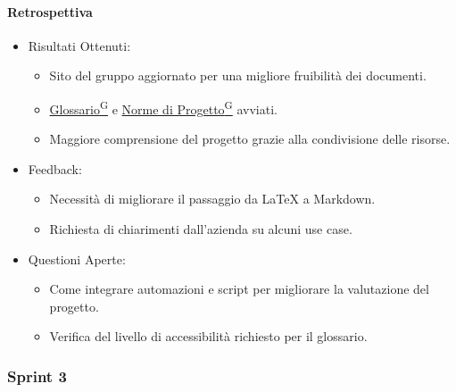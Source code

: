 \documentclass{article}
\begin{document}
                \paragraph{Retrospettiva}
                \begin{itemize}
                    \item Risultati Ottenuti:
                        \begin{itemize}
                            \item Sito del gruppo aggiornato per una migliore fruibilità dei documenti.
                            \item \href{https://code7crusaders.github.io/docs/PB/documentazione_interna/glossario.html#glossario}{Glossario\textsuperscript{G}} e \href{https://code7crusaders.github.io/docs/PB/documentazione_interna/glossario.html#norme-di-progetto}{Norme di Progetto\textsuperscript{G}} avviati.
                            \item Maggiore comprensione del progetto grazie alla condivisione delle risorse.
                        \end{itemize}
                    \item Feedback:
                        \begin{itemize}
                            \item Necessità di migliorare il passaggio da LaTeX a Markdown.
                            \item Richiesta di chiarimenti dall'azienda su alcuni use case.
                        \end{itemize}
                    \item Questioni Aperte:
                        \begin{itemize}
                            \item Come integrare automazioni e script per migliorare la valutazione del progetto.
                            \item Verifica del livello di accessibilità richiesto per il glossario.
                        \end{itemize}
                \end{itemize}
            \subsubsection{Sprint 3}
\end{document}
